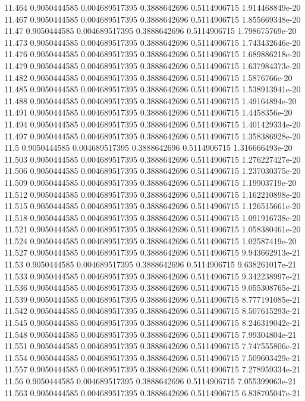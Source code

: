 {11.464 0.9050444585 0.004689517395 0.3888642696 0.5114906715 1.914468849e-20
11.467 0.9050444585 0.004689517395 0.3888642696 0.5114906715 1.855669348e-20
11.47 0.9050444585 0.004689517395 0.3888642696 0.5114906715 1.798675769e-20
11.473 0.9050444585 0.004689517395 0.3888642696 0.5114906715 1.743432646e-20
11.476 0.9050444585 0.004689517395 0.3888642696 0.5114906715 1.689886218e-20
11.479 0.9050444585 0.004689517395 0.3888642696 0.5114906715 1.637984373e-20
11.482 0.9050444585 0.004689517395 0.3888642696 0.5114906715 1.5876766e-20
11.485 0.9050444585 0.004689517395 0.3888642696 0.5114906715 1.538913941e-20
11.488 0.9050444585 0.004689517395 0.3888642696 0.5114906715 1.49164894e-20
11.491 0.9050444585 0.004689517395 0.3888642696 0.5114906715 1.4458356e-20
11.494 0.9050444585 0.004689517395 0.3888642696 0.5114906715 1.401429334e-20
11.497 0.9050444585 0.004689517395 0.3888642696 0.5114906715 1.358386928e-20
11.5 0.9050444585 0.004689517395 0.3888642696 0.5114906715 1.316666493e-20
11.503 0.9050444585 0.004689517395 0.3888642696 0.5114906715 1.276227427e-20
11.506 0.9050444585 0.004689517395 0.3888642696 0.5114906715 1.237030375e-20
11.509 0.9050444585 0.004689517395 0.3888642696 0.5114906715 1.19903719e-20
11.512 0.9050444585 0.004689517395 0.3888642696 0.5114906715 1.162210898e-20
11.515 0.9050444585 0.004689517395 0.3888642696 0.5114906715 1.126515661e-20
11.518 0.9050444585 0.004689517395 0.3888642696 0.5114906715 1.091916738e-20
11.521 0.9050444585 0.004689517395 0.3888642696 0.5114906715 1.058380461e-20
11.524 0.9050444585 0.004689517395 0.3888642696 0.5114906715 1.02587419e-20
11.527 0.9050444585 0.004689517395 0.3888642696 0.5114906715 9.943662913e-21
11.53 0.9050444585 0.004689517395 0.3888642696 0.5114906715 9.638261017e-21
11.533 0.9050444585 0.004689517395 0.3888642696 0.5114906715 9.342238997e-21
11.536 0.9050444585 0.004689517395 0.3888642696 0.5114906715 9.055308765e-21
11.539 0.9050444585 0.004689517395 0.3888642696 0.5114906715 8.777191085e-21
11.542 0.9050444585 0.004689517395 0.3888642696 0.5114906715 8.507615293e-21
11.545 0.9050444585 0.004689517395 0.3888642696 0.5114906715 8.246319042e-21
11.548 0.9050444585 0.004689517395 0.3888642696 0.5114906715 7.99304804e-21
11.551 0.9050444585 0.004689517395 0.3888642696 0.5114906715 7.747555806e-21
11.554 0.9050444585 0.004689517395 0.3888642696 0.5114906715 7.509603429e-21
11.557 0.9050444585 0.004689517395 0.3888642696 0.5114906715 7.278959334e-21
11.56 0.9050444585 0.004689517395 0.3888642696 0.5114906715 7.055399063e-21
11.563 0.9050444585 0.004689517395 0.3888642696 0.5114906715 6.838705047e-21
}
